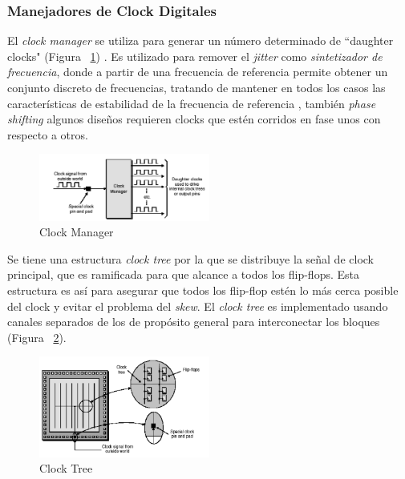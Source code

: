 		\subsubsection{Manejadores de Clock Digitales}
		\par
		El \textit{clock manager} se utiliza para generar un número determinado de “daughter clocks" (Figura ~\ref{fig:dclocks}) . Es utilizado para
		remover el \textit{jitter} como \textit{sintetizador de frecuencia}, donde a partir de una frecuencia de referencia permite obtener un conjunto
		discreto de frecuencias, tratando de mantener en todos los casos las características de estabilidad de la frecuencia de referencia
		\cite{Etiqueta03}, también \textit{phase shifting} algunos diseños requieren clocks que estén corridos en fase unos con respecto a otros.

		\begin{figure}[h!]
 		\begin{center}
 		\includegraphics[width=0.5\textwidth,keepaspectratio=true]{./images/dougther}
  		\caption{Clock Manager}
  		\label{fig:dclocks}
 		\end{center}
		\end{figure}

		\vspace{0.5cm}
		\par
		Se tiene  una estructura \textit{clock tree} por la que se distribuye la señal de clock principal, que es ramificada para
		que alcance a todos los flip-flops. Esta estructura es así para asegurar que todos los flip-flop estén lo más cerca posible del clock y evitar el
		problema del \textit{skew}. El \textit{clock tree} es implementado usando canales separados de los de propósito general para interconectar los
		bloques (Figura ~\ref{fig:ctree}).

		\begin{figure}[h!]
 		\begin{center}
 		\includegraphics[width=0.5\textwidth,keepaspectratio=true]{./images/clocktree}
  		\caption{Clock Tree}
  		\label{fig:ctree}
 		\end{center}
		\end{figure}

